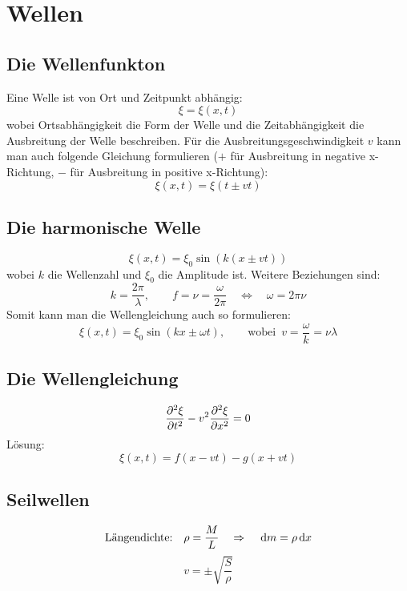 \section{Wellen}
\subsection{Die Wellenfunkton}
Eine Welle ist von Ort und Zeitpunkt abhängig:
\begin{equation}
\xi = \xi (x, t)
\end{equation}
wobei Ortsabhängigkeit die Form der Welle und die Zeitabhängigkeit die Ausbreitung der Welle beschreiben. Für die Ausbreitungsgeschwindigkeit $v$ kann man auch folgende Gleichung formulieren ($+$ für Ausbreitung in negative x-Richtung, $-$ für Ausbreitung in positive x-Richtung): 
\begin{equation}
\xi (x, t) = \xi(t \pm vt)
\end{equation}
\subsection{Die harmonische Welle}
\begin{equation}
\xi (x, t) = \xi _0 \sin \left( k \left( x \pm vt \right) \right)
\end{equation}
wobei $k$ die Wellenzahl und $\xi _0$ die Amplitude ist. Weitere Beziehungen sind:
\begin{equation}
k = \dfrac{2 \pi}{\lambda}, \qquad f = \nu = \dfrac{\omega}{2 \pi} \quad\Leftrightarrow\quad \omega = 2 \pi \nu
\end{equation}
Somit kann man die Wellengleichung auch so formulieren:
\begin{equation}
\xi (x, t) = \xi _0 \sin \left( k x \pm \omega t  \right), \qquad \text{wobei} \enspace v = \dfrac{\omega}{k} = \nu \lambda
\end{equation}
\subsection{Die Wellengleichung}
\begin{equation}
\frac{\partial ^2 \xi}{\partial t^2} - v^2 \frac{\partial ^2 \xi}{\partial x^2} = 0
\end{equation}
Lösung:
\begin{equation}
\xi (x, t) = f(x -vt) - g(x + vt)
\end{equation}
\subsection{Seilwellen}
\begin{equation}
\text{Längendichte:} \quad \rho = \frac{M}{L} \quad\Rightarrow\quad \,\mathrm{d} m = \rho \,\mathrm{d} x
\end{equation}
\begin{equation}
v = \pm \sqrt{\frac{S}{\rho}}
\end{equation}
